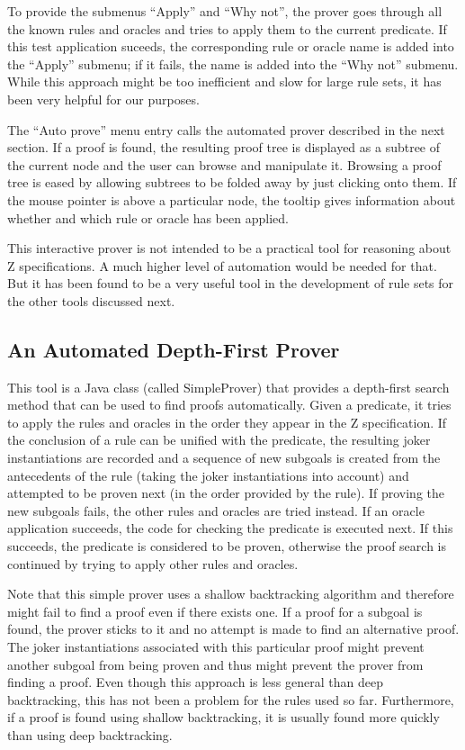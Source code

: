 \documentclass{entcs}
\begin{document}
To provide the submenus ``Apply'' and ``Why not'', the prover goes
through all the known rules and oracles and tries to apply them to the
current predicate.  If this test application suceeds, the
corresponding rule or oracle name is added into the ``Apply''
submenu; if it fails, the name is added into the ``Why not''
submenu.  While this approach might be too inefficient and slow for
large rule sets, it has been very helpful for our purposes.

The ``Auto prove'' menu entry calls the automated prover described in
the next section.  If a proof is found, the resulting proof tree is
displayed as a subtree of the current node and the user can browse and
manipulate it.  Browsing a proof tree is eased by allowing subtrees to
be folded away by just clicking onto them.  If the mouse pointer is
above a particular node, the tooltip gives information about whether
and which rule or oracle has been applied.

This interactive prover is not intended to be a practical tool for
reasoning about Z specifications.  A much higher level of automation
would be needed for that.  But it has been found to be a very useful
tool in the development of rule sets for the other tools discussed
next.

\subsection{An Automated Depth-First Prover}

This tool is a Java class (called SimpleProver) that provides a
depth-first search method that can be used to find proofs
automatically.  Given a predicate, it tries to apply the rules and
oracles in the order they appear in the Z specification.  If the
conclusion of a rule can be unified with the predicate, the resulting
joker instantiations are recorded and a sequence of new subgoals is
created from the antecedents of the rule (taking the joker
instantiations into account) and attempted to be proven next (in the
order provided by the rule).  If proving the new subgoals fails, the
other rules and oracles are tried instead.  If an oracle application
succeeds, the code for checking the predicate is executed next.  If
this succeeds, the predicate is considered to be proven, otherwise the
proof search is continued by trying to apply other rules and oracles.

Note that this simple prover uses a shallow backtracking algorithm and
therefore might fail to find a proof even if there exists one.  If a
proof for a subgoal is found, the prover sticks to it and no attempt
is made to find an alternative proof.  The joker instantiations
associated with this particular proof might prevent another subgoal
from being proven and thus might prevent the prover from finding a
proof.  Even though this approach is less general than deep
backtracking, this has not been a problem for the rules used so far.
Furthermore, if a proof is found using shallow backtracking, it is
usually found more quickly than using deep backtracking.
\end{document}
